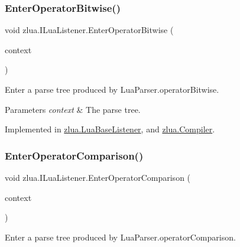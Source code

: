 \subsubsection{\texorpdfstring{Enter\+Operator\+Bitwise()}{EnterOperatorBitwise()}}
{\footnotesize\ttfamily void zlua.\+I\+Lua\+Listener.\+Enter\+Operator\+Bitwise (\begin{DoxyParamCaption}\item[{\mbox{[}\+Not\+Null\mbox{]} \mbox{\hyperlink{classzlua_1_1_lua_parser_1_1_operator_bitwise_context}{Lua\+Parser.\+Operator\+Bitwise\+Context}}}]{context }\end{DoxyParamCaption})}



Enter a parse tree produced by Lua\+Parser.\+operator\+Bitwise. 


\begin{DoxyParams}{Parameters}
{\em context} & The parse tree.\\
\hline
\end{DoxyParams}


Implemented in \mbox{\hyperlink{classzlua_1_1_lua_base_listener_af4009c58d1272593e9d8a18b8e306591}{zlua.\+Lua\+Base\+Listener}}, and \mbox{\hyperlink{classzlua_1_1_compiler_a13c55dd9aa0ccdf16a6855282091f63f}{zlua.\+Compiler}}.

\mbox{\label{interfacezlua_1_1_i_lua_listener_a5af42c94cc987459977c34f85b037120}} 
\subsubsection{\texorpdfstring{Enter\+Operator\+Comparison()}{EnterOperatorComparison()}}
{\footnotesize\ttfamily void zlua.\+I\+Lua\+Listener.\+Enter\+Operator\+Comparison (\begin{DoxyParamCaption}\item[{\mbox{[}\+Not\+Null\mbox{]} \mbox{\hyperlink{classzlua_1_1_lua_parser_1_1_operator_comparison_context}{Lua\+Parser.\+Operator\+Comparison\+Context}}}]{context }\end{DoxyParamCaption})}



Enter a parse tree produced by Lua\+Parser.\+operator\+Comparison. 



